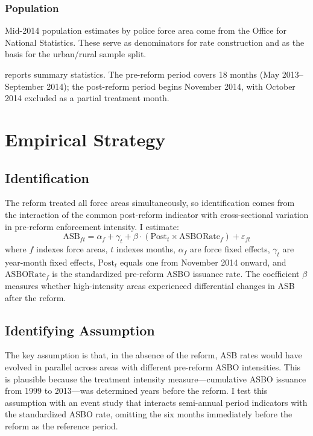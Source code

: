 \documentclass[12pt]{article}
\begin{document}
\subsubsection*{Population} Mid-2014 population estimates by police force area come from the Office for National Statistics. These serve as denominators for rate construction and as the basis for the urban/rural sample split.

 reports summary statistics. The pre-reform period covers 18 months (May 2013--September 2014); the post-reform period begins November 2014, with October 2014 excluded as a partial treatment month.




\section{Empirical Strategy}

\subsection{Identification}

The reform treated all force areas simultaneously, so identification comes from the interaction of the common post-reform indicator with cross-sectional variation in pre-reform enforcement intensity. I estimate:
\begin{equation}
\text{ASB}_{ft} = \alpha_f + \gamma_t + \beta \cdot (\text{Post}_t \times \text{ASBORate}_f) + \varepsilon_{ft}
\label{eq:main}
\end{equation}
where $f$ indexes force areas, $t$ indexes months, $\alpha_f$ are force fixed effects, $\gamma_t$ are year-month fixed effects, $\text{Post}_t$ equals one from November 2014 onward, and $\text{ASBORate}_f$ is the standardized pre-reform ASBO issuance rate. The coefficient $\beta$ measures whether high-intensity areas experienced differential changes in ASB after the reform.

\subsection{Identifying Assumption}

The key assumption is that, in the absence of the reform, ASB rates would have evolved in parallel across areas with different pre-reform ASBO intensities. This is plausible because the treatment intensity measure---cumulative ASBO issuance from 1999 to 2013---was determined years before the reform. I test this assumption with an event study that interacts semi-annual period indicators with the standardized ASBO rate, omitting the six months immediately before the reform as the reference period.
\end{document}
